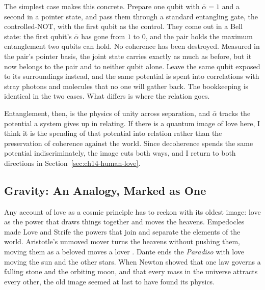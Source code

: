The simplest case makes this concrete. Prepare one qubit with $\bar{\alpha} = 1$ and a second in a pointer state, and pass them through a standard entangling gate, the controlled-NOT, with the first qubit as the control. They come out in a Bell state: the first qubit's $\bar{\alpha}$ has gone from $1$ to $0$, and the pair holds the maximum entanglement two qubits can hold. No coherence has been destroyed. Measured in the pair's pointer basis, the joint state carries exactly as much as before, but it now belongs to the pair and to neither qubit alone. Leave the same qubit exposed to its surroundings instead, and the same potential is spent into correlations with stray photons and molecules that no one will gather back. The bookkeeping is identical in the two cases. What differs is where the relation goes.

Entanglement, then, is the physics of unity across separation, and $\bar{\alpha}$ tracks the potential a system gives up in relating. If there is a quantum image of love here, I think it is the spending of that potential into relation rather than the preservation of coherence against the world. Since decoherence spends the same potential indiscriminately, the image cuts both ways, and I return to both directions in Section~\ref{sec:ch14-human-love}.

\subsection*{Gravity: An Analogy, Marked as One}

Any account of love as a cosmic principle has to reckon with its oldest image: love as the power that draws things together and moves the heavens. Empedocles made Love and Strife the powers that join and separate the elements of the world. Aristotle's unmoved mover turns the heavens without pushing them, moving them as a beloved moves a lover \citep{Aristotle_Metaphysics}. Dante ends the \textit{Paradiso} with love moving the sun and the other stars. When Newton showed that one law governs a falling stone and the orbiting moon, and that every mass in the universe attracts every other, the old image seemed at last to have found its physics.

